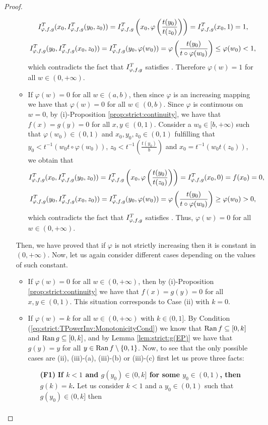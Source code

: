 \begin{proof}
\begin{enumerate}
\begin{itemize}
			$$I^T_{\varphi,f,g}(x_0,I^T_{\varphi,f,g}(y_0,z_0))=I^T_{\varphi,f,g}\left(x_0,\varphi\left(\frac{t(y_0)}{t(z_0)}\right)\right) =I^T_{\varphi,f,g}(x_0,1)=1,$$
			$$ I^T_{\varphi,f,g}(y_0,I^T_{\varphi,f,g}(x_0,z_0))=I^T_{\varphi,f,g}(y_0,\varphi(w_0))=\varphi\left(\frac{t(y_0)}{t\circ\varphi(w_0)}\right) \leq \varphi(w_0)<1,$$
			which contradicts the fact that $I^T_{\varphi,f,g}$ satisfies \EP. Therefore $\varphi(w)=1$ for all $w \in (0,+\infty)$.
			\item If $\varphi(w)=0$ for all $w \in (a,b)$, then since $\varphi$ is an increasing mapping  we have that $\varphi(w)=0$ for all $w \in (0,b)$. Since $\varphi$ is continuous on $w=0$, by (i)-Proposition \ref{prop:strict:continuity}, we have that $f(x)=g(y)=0$ for all $x,y \in (0,1)$. Consider a $w_0 \in [b,+\infty)$ such that $\varphi(w_0) \in (0,1)$ and $x_0,y_0,z_0 \in (0,1)$ fulfilling that $y_0 < t^{-1}(w_0 t\circ \varphi(w_0))$, $ z_0 < t^{-1}\left(\frac{t(y_0)}{b}\right)$ and $x_0=t^{-1}(w_0t(z_0))$, we obtain that
			$$I^T_{\varphi,f,g}(x_0,I^T_{\varphi,f,g}(y_0,z_0))=I^T_{\varphi,f,g}\left(x_0,\varphi \left(\frac{t(y_0)}{t(z_0)}\right)\right)=I^T_{\varphi,f,g}(x_0,0)=f(x_0)=0,$$
			$$I^T_{\varphi,f,g}(y_0,I^T_{\varphi,f,g}(x_0,z_0))=I^T_{\varphi,f,g}(y_0,\varphi(w_0))=\varphi \left(\frac{t(y_0)}{t\circ\varphi(w_0)}\right) \geq \varphi(w_0)>0,$$
			which contradicts the fact that $I^T_{\varphi,f,g}$ satisfies \EP. Thus, $\varphi(w)=0$ for all $w \in (0,+\infty)$.
		\end{itemize}
		Then, we have proved that if $\varphi$ is not strictly increasing then it is constant in $(0,+\infty)$. Now, let us again consider different cases depending on the values of such constant.
		\begin{itemize}
			\item If $\varphi(w)=0$ for all $w \in (0,+\infty)$, then by (i)-Proposition \ref{prop:strict:continuity} we have that $f(x)=g(y)=0$ for all $x,y \in (0,1)$. This situation corresponds to Case (ii) with $k=0$.
			\item If $\varphi(w)=k$ for all $w \in (0,+\infty)$ with $k \in (0,1]$. By Condition (\ref{eq:strict:TPowerInv:MonotonicityCond}) we know that $\operatorname{Ran} f \subseteq [0,k]$ and $\operatorname{Ran} g \subseteq [0,k]$, and by Lemma \ref{lem:strict:g(EP)} we have that $g(y)=y$ for all $y \in \operatorname{Ran} f \setminus \{0,1\}$. Now, to see that the only possible cases are (ii), (iii)-(a), (iii)-(b) or (iii)-(c) first let us prove three facts:
			\begin{enumerate}
				\item[\bf (F1)] \textbf{If $k < 1$ and $g(y_0) \in (0,k]$ for some $y_0 \in (0,1)$, then $g(k)=k$.} Let us consider $k < 1$ and a $y_0 \in (0,1)$ such that $g(y_0) \in (0,k]$ then 
				\begin{eqnarray*}

\end{eqnarray*}
\end{enumerate}
\end{itemize}
\end{enumerate}
\end{proof}
